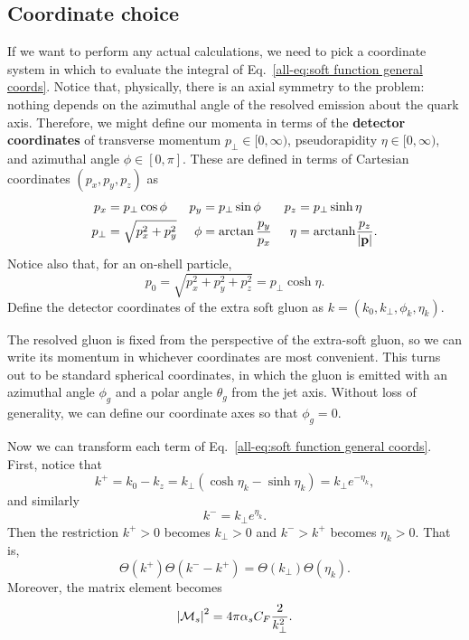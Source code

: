\documentclass[../thesis.tex]{subfiles}
\providecommand{\arctanh}{\mathrm{arctanh}}
\providecommand{\cM}{\mathcal{M}}
\begin{document}
\subsection{Coordinate choice}
	If we want to perform any actual calculations, we need to pick a coordinate system in which to evaluate the integral of Eq.~\ref{all-eq:soft function general coords}. Notice that, physically, there is an axial symmetry to the problem: nothing depends on the azimuthal angle of the resolved emission about the quark axis. Therefore, we might define our momenta in terms of the \textbf{detector coordinates} of transverse momentum $p_\perp \in [0, \infty)$, pseudorapidity $\eta \in [0, \infty)$, and azimuthal angle $\phi \in [0, \pi]$. These are defined in terms of Cartesian coordinates $(p_x, p_y, p_z)$ as
	\begin{align}
		p_x &= p_\perp \cos\phi & p_y &= p_\perp \sin\phi & p_z &= p_\perp \sinh\eta \\
		p_\perp &= \sqrt{p_x^2 + p_y^2} & \phi &= \arctan\frac{p_y}{p_x} & \eta &= \arctanh\frac{p_z}{\abs{\vb{p}}}.
	\end{align}
	Notice also that, for an on-shell particle,
	\begin{equation}
		p_0 = \sqrt{p_x^2 + p_y^2 + p_z^2} = p_\perp \cosh\eta.
	\end{equation}
	Define the detector coordinates of the extra soft gluon as $k = (k_0, k_\perp, \phi_k, \eta_k)$.

	The resolved gluon is fixed from the perspective of the extra-soft gluon, so we can write its momentum in whichever coordinates are most convenient. This turns out to be standard spherical coordinates, in which the gluon is emitted with an azimuthal angle $\phi_g$ and a polar angle $\theta_g$ from the jet axis. Without loss of generality, we can define our coordinate axes so that $\phi_g = 0$.

	Now we can transform each term of Eq.~\ref{all-eq:soft function general coords}. First, notice that
	\begin{equation}
		k^+ = k_0 - k_z = k_\perp (\cosh\eta_k - \sinh\eta_k) = k_\perp e^{-\eta_k},
	\end{equation}
	and similarly
	\begin{equation}
		k^- = k_\perp e^{\eta_k}.
	\end{equation}
	Then the restriction $k^+ > 0$ becomes $k_\perp > 0$ and $k^- > k^+$ becomes $\eta_k > 0$. That is,
	\begin{equation}\label{all-eq:phase space constraints specific coords}
		\Theta(k^+) \Theta(k^- - k^+) = \Theta(k_\perp)\Theta(\eta_k).
	\end{equation}
	Moreover, the matrix element becomes
	\begin{equation}\label{all-eq:matrix element specific coords}
		\abs{\cM_s}^2 = 4\pi\alpha_s C_F \frac{2}{k_\perp^2}.
	\end{equation}
\end{document}
